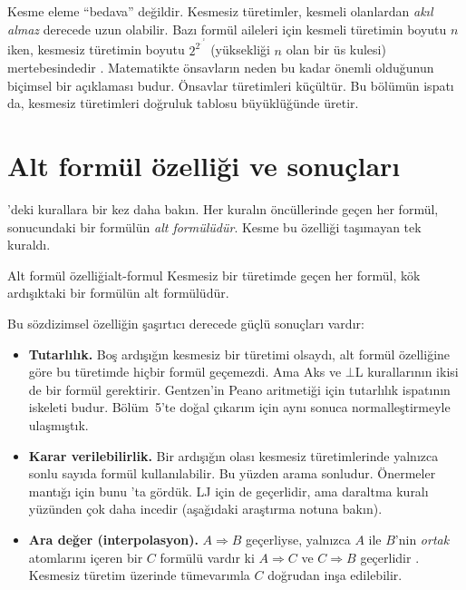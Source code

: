 \begin{dikkat}
Kesme eleme ``bedava'' değildir. Kesmesiz türetimler, kesmeli olanlardan
\emph{akıl almaz} derecede uzun olabilir. Bazı formül aileleri için
kesmeli türetimin boyutu $n$ iken, kesmesiz türetimin boyutu $2^{2^{\cdot^{\cdot^{2}}}}$
(yüksekliği $n$ olan bir üs kulesi) mertebesindedir \citep{statman1979}.
Matematikte önsavların neden bu kadar önemli olduğunun biçimsel bir
açıklaması budur. Önsavlar türetimleri küçültür. Bu bölümün
 ispatı da, kesmesiz türetimleri doğruluk tablosu
büyüklüğünde üretir.
\end{dikkat}

\section{Alt formül özelliği ve sonuçları}\label{sec:alt-formul}

'deki kurallara bir kez daha bakın. Her kuralın
öncüllerinde geçen her formül, sonucundaki bir formülün \emph{alt
formülüdür}. Kesme bu özelliği taşımayan tek kuraldı.

\begin{teorem}{Alt formül özelliği}{alt-formul}
Kesmesiz bir türetimde geçen her formül, kök ardışıktaki bir formülün alt
formülüdür.
\end{teorem}

\noindent Bu sözdizimsel özelliğin şaşırtıcı derecede güçlü sonuçları
vardır:

\begin{itemize}
  \item \textbf{Tutarlılık.} Boş ardışığın kesmesiz bir türetimi
        olsaydı, alt formül özelliğine göre bu türetimde hiçbir formül
        geçemezdi. Ama Aks ve $\bot$L kurallarının ikisi de bir formül
        gerektirir. Gentzen'in Peano aritmetiği için tutarlılık ispatının
        iskeleti budur. Bölüm~5'te doğal çıkarım için aynı sonuca
        normalleştirmeyle ulaşmıştık.
  \item \textbf{Karar verilebilirlik.} Bir ardışığın olası kesmesiz
        türetimlerinde yalnızca sonlu sayıda formül kullanılabilir. Bu
        yüzden arama sonludur. Önermeler mantığı için bunu
        'ta gördük. LJ için de geçerlidir, ama daraltma
        kuralı yüzünden çok daha incedir (aşağıdaki araştırma notuna
        bakın).
  \item \textbf{Ara değer (interpolasyon).} $A \Rightarrow B$ geçerliyse,
        yalnızca $A$ ile $B$'nin \emph{ortak} atomlarını içeren bir $C$
        formülü vardır ki $A \Rightarrow C$ ve $C \Rightarrow B$ geçerlidir
        \citep{craig1957}. Kesmesiz türetim üzerinde tümevarımla $C$
        doğrudan inşa edilebilir.
\end{itemize}

